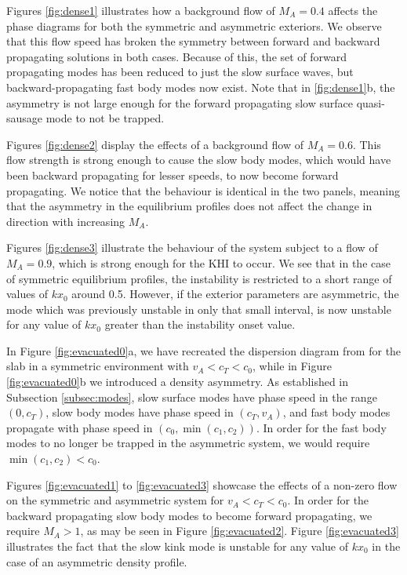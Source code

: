 Figures \ref{fig:dense1} illustrates how a background flow of $M_A = 0.4$ affects the phase diagrams for both the symmetric and asymmetric exteriors.
We observe that this flow speed has broken the symmetry between forward and backward propagating solutions in both cases.
Because of this, the set of forward propagating modes has been reduced to just the slow surface waves, but backward-propagating fast body modes now exist.
Note that in \ref{fig:dense1}b, the asymmetry is not large enough for the forward propagating slow surface quasi-sausage mode to not be trapped.

Figures \ref{fig:dense2} display the effects of a background flow of $M_A = 0.6$.
This flow strength is strong enough to cause the slow body modes, which would have been backward propagating for lesser speeds, to now become forward propagating.
We notice that the behaviour is identical in the two panels, meaning that the asymmetry in the equilibrium profiles does not affect the change in direction with increasing $M_A$.

Figures \ref{fig:dense3} illustrate the behaviour of the system subject to a flow of $M_A = 0.9$, which is strong enough for the KHI to occur.
We see that in the case of symmetric equilibrium profiles, the instability is restricted to a short range of values of $k x_0$ around 0.5.
However, if the exterior parameters are asymmetric, the mode which was previously unstable in only that small interval, is now unstable for any value of $k x_0$ greater than the instability onset value.

In Figure \ref{fig:evacuated0}a, we have recreated the dispersion diagram from \cite{Roberts1981b} for the slab in a symmetric environment with $v_A < c_T < c_0$, while in Figure \ref{fig:evacuated0}b we introduced a density asymmetry.
As established in Subsection \ref{subsec:modes}, slow surface modes have phase speed in the range $(0, c_T)$, slow body modes have phase speed in $(c_T, v_A)$, and fast body modes propagate with phase speed in $(c_0, \min(c_1, c_2))$.
In order for the fast body modes to no longer be trapped in the asymmetric system, we would require $\min(c_1, c_2) < c_0$.

Figures \ref{fig:evacuated1} to \ref{fig:evacuated3} showcase the effects of a non-zero flow on the symmetric and asymmetric system for $v_A < c_T < c_0$.
In order for the backward propagating slow body modes to become forward propagating, we require $M_A > 1$, as may be seen in Figure \ref{fig:evacuated2}.
Figure \ref{fig:evacuated3} illustrates the fact that the slow kink mode is unstable for any value of $k x_0$ in the case of an asymmetric density profile.

